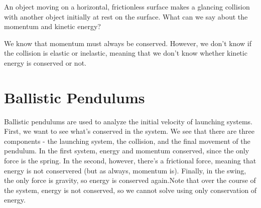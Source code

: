 \documentclass[11pt]{article}
\begin{document}
\begin{question}
	An object moving on a horizontal, frictionless surface makes a glancing collision with another object initially at rest on the surface. What can we say about the momentum and kinetic energy?
\end{question}
\begin{solution}
	We know that momentum must always be conserved. However, we don't know if the collision is elastic or inelastic, meaning that we don't know whether kinetic energy is conserved or not.
\end{solution}

\section{Ballistic Pendulums}
Ballistic pendulums are used to analyze the initial velocity of launching systems. First, we want to see what's conserved in the system. We see that there are three components - the launching system, the collision, and the final movement of the pendulum. In the first system, energy and momentum conserved, since the only force is the spring. In the second, however, there's a frictional force, meaning that energy is not conservered (but as always, momentum is). Finally, in the swing, the only force is gravity, so energy is conserved again.Note that over the course of the system, energy is not conserved, so we cannot solve using only conservation of energy.
\end{document}
